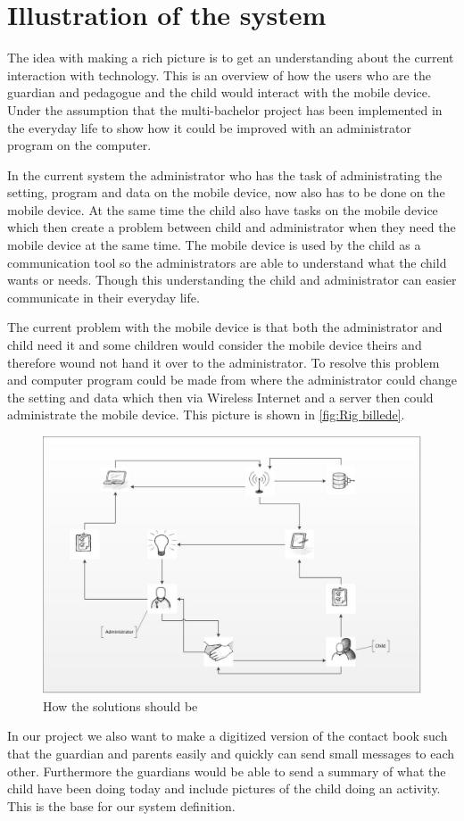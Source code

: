 \section{Illustration of the system}
The idea with making a rich picture is to get an understanding about the current interaction with technology. This is an overview of how the users who are the guardian and pedagogue and the child would interact with the mobile device. Under the assumption that the multi-bachelor project has been implemented in the everyday life to show how it could be improved with an administrator program on the computer.

In the current system the administrator who has the task of administrating the setting, program and data on the mobile device, now also has to be done on the mobile device. At the same time the child also have tasks on the mobile device which then create a problem between child and administrator when they need the mobile device at the same time. The mobile device is used by the child as a communication tool so the administrators are able to understand what the child wants or needs. Though this understanding the child and administrator can easier communicate in their everyday life.

The current problem with the mobile device is that both the administrator and child need it and some children would consider the mobile device theirs and therefore wound not hand it over to the administrator. To resolve this problem and computer program could be made from where the administrator could change the setting and data which then via Wireless Internet and a server then could administrate the mobile device. This picture is shown in \vref{fig:Rig billede}. 

\begin{figure}[h]
	\centering
		\includegraphics[width=1.00\textwidth]{img/Rig_billede.jpg}
	\caption{How the solutions should be}
	\label{fig:Rig billede}
\end{figure}

In our project we also want to make a digitized version of the contact book such that the guardian and parents easily and quickly can send small messages to each other. Furthermore the guardians would be able to send a summary of what the child have been doing today and include pictures of the child doing an activity. This is the base for our system definition.    